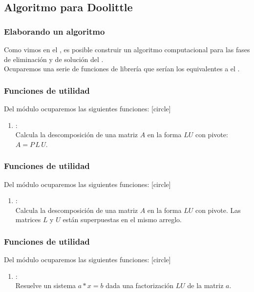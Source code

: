 \subsection{Algoritmo para Doolittle}
\begin{frame}
\frametitle{Elaborando un algoritmo}
Como vimos en el , es posible construir un algoritmo computacional para las fases de eliminación y de solución del .
\\
\bigskip
Ocuparemos una serie de funciones de librería  que serían los equivalentes a el .
\end{frame}
\begin{frame}
\frametitle{Funciones de utilidad}
Del módulo  ocuparemos las siguientes funciones:
[circle]
\begin{enumerate}[<+->]
\item {}:
\\
Calcula la descomposición de una matriz $A$ en la forma $LU$ con pivote: $A = P \, L \, U$.
\seti
\end{enumerate}
\end{frame}
\begin{frame}
\frametitle{Funciones de utilidad}
Del módulo  ocuparemos las siguientes funciones:
[circle]
\begin{enumerate}[<+->]
\conti
\item {}:
\\
Calcula la descomposición de una matriz $A$ en la forma $LU$ con pivote. Las matrices $L$ y $U$ están superpuestas en el mismo arreglo. \\
\seti
\end{enumerate}
\end{frame}
\begin{frame}
\frametitle{Funciones de utilidad}
Del módulo  ocuparemos las siguientes funciones:
[circle]
\begin{enumerate}[<+->]
\conti
\item {}:
\\
Resuelve un sistema $a * x = b$ dada una factorización $LU$ de la matriz $a$.
\end{enumerate}
\end{frame}
